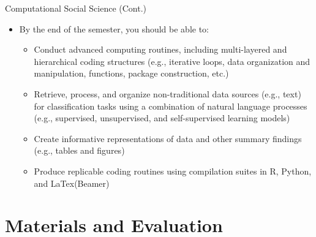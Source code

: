 \documentclass[
  ignorenonframetext,
]{beamer}
\providecommand{\tightlist}{%
  \setlength{\itemsep}{0pt}\setlength{\parskip}{0pt}}
\begin{document}
\begin{frame}{Computational Social Science (Cont.)}
\label{computational-social-science-cont.-1}
\begin{itemize}
\tightlist
\item
  By the end of the semester, you should be able to:

  \par \vspace{2.5mm}

  \begin{itemize}
  \tightlist
  \item
    Conduct advanced computing routines, including multi-layered and
    hierarchical coding structures \footnotesize (e.g., iterative loops,
    data organization and manipulation, functions, package construction,
    etc.)

    \par \vspace{1.5mm}
  \item
    Retrieve, process, and organize non-traditional data sources (e.g.,
    text) for classification tasks using a combination of natural
    language processes (e.g., supervised, unsupervised, and
    self-supervised learning models)

    \par \vspace{1.5mm}
  \item
    Create informative representations of data and other summary
    findings (e.g., tables and figures)

    \par \vspace{1.5mm}
  \item
    Produce replicable coding routines using compilation suites in R,
    Python, and LaTex(Beamer)

    \par \vspace{1.5mm}
  \end{itemize}
\end{itemize}
\end{frame}

\section{Materials and Evaluation}\label{materials-and-evaluation}
\end{document}
